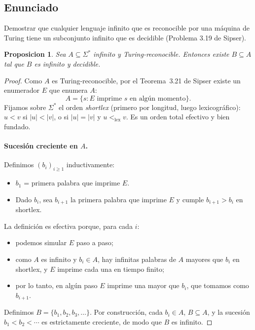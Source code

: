 \documentclass[11pt,a4paper]{article}
\theoremstyle{plain}
\newtheorem{proposicion}[teorema]{Proposicion}
\theoremstyle{definition}
\theoremstyle{remark}
\newcommand{\Sstar}{\Sigma^{*}}
\begin{document}
\subsection*{Enunciado}

Demostrar que cualquier lenguaje infinito que es reconocible por una m\'aquina
de Turing tiene un subconjunto infinito que es decidible
(Problema 3.19 de Sipser).

\begin{proposicion}
\label{prop:sub-decidible}
Sea $A\subseteq\Sstar$ infinito y Turing-reconocible. Entonces existe
$B\subseteq A$ tal que $B$ es infinito y decidible.
\end{proposicion}

\begin{proof}
Como $A$ es Turing-reconocible, por el Teorema~3.21 de Sipser existe un
enumerador $E$ que enumera $A$:
\[
  A = \{s : E \text{ imprime } s \text{ en alg\'un momento}\}.
\]
Fijamos sobre $\Sstar$ el orden \emph{shortlex} (primero por longitud, luego
lexicogr\'afico): $u<v$ si $|u|<|v|$, o si $|u|=|v|$ y $u<_{\text{lex}}v$.
Es un orden total efectivo y bien fundado.

\paragraph{Sucesi\'on creciente en $A$.}
Definimos $(b_i)_{i\ge 1}$ inductivamente:
\begin{itemize}
  \item $b_1$ = primera palabra que imprime $E$.
  \item Dado $b_i$, sea $b_{i+1}$ la primera palabra que imprime $E$ y
        cumple $b_{i+1} > b_i$ en shortlex.
\end{itemize}
La definici\'on es efectiva porque, para cada $i$:
\begin{itemize}
  \item podemos simular $E$ paso a paso;
  \item como $A$ es infinito y $b_i\in A$, hay infinitas palabras de $A$
        mayores que $b_i$ en shortlex, y $E$ imprime cada una en tiempo
        finito;
  \item por lo tanto, en alg\'un paso $E$ imprime una mayor que $b_i$, que
        tomamos como $b_{i+1}$.
\end{itemize}
Definimos $B = \{b_1, b_2, b_3, \dots\}$. Por construcci\'on, cada $b_i\in A$,
$B\subseteq A$, y la sucesi\'on $b_1<b_2<\cdots$ es estrictamente creciente,
de modo que $B$ es infinito.


\end{proof}
\end{document}
